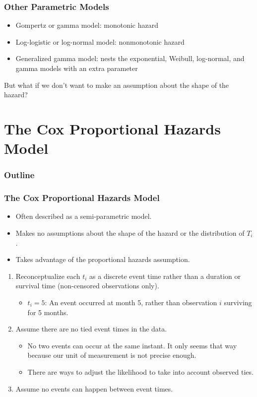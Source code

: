 \documentclass{beamer}
\begin{document}
\begin{frame}
\normalsize
\frametitle{Other Parametric Models}
\pause
\begin{itemize}
\item Gompertz or gamma model: monotonic hazard
\pause
\item Log-logistic or log-normal model: nonmonotonic hazard
\pause
\item Generalized gamma model: nests the exponential, Weibull,
log-normal, and gamma models with an extra parameter
\end{itemize}
\pause
\bigskip
But what if we don't want to make an assumption about the shape of the
hazard?
\end{frame}

\section{The Cox Proportional Hazards Model}

\begin{frame}
\frametitle{Outline}
\tableofcontents[currentsection]
\end{frame}

\begin{frame}
\frametitle{The Cox Proportional Hazards Model}
\pause
\begin{itemize}
\item Often described as a semi-parametric model.
\pause
\item Makes no assumptions about the shape of the hazard or the
distribution of $T_i$.
\pause
\item Takes advantage of the proportional hazards assumption.
\end{itemize}
\end{frame}

\begin{frame}
\begin{enumerate}
\item Reconceptualize each $t_i$ as a discrete event time rather than
a duration or survival time (non-censored observations only). 
\pause
\begin{itemize}
\item $t_i = 5$: An event occurred at month 5, rather than observation
$i$ surviving for 5 months.
\end{itemize}
\pause
\item Assume there are no tied event times in the data.
\pause
\begin{itemize}
\pause
\item No two events can occur at the same instant.  It only seems that
way because our unit of measurement is not precise enough.
\pause
\item There are ways to adjust the likelihood to take into account
observed ties.
\end{itemize}
\pause
\item Assume no events can happen between event times.
\end{enumerate}
\end{frame}
\end{document}
